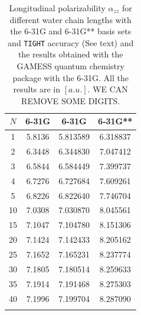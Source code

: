 \documentclass[prl,aps,twocolumn,showpacs,twocolumngrid,superbib]{revtex4}
\begin{document}
\begin{table}[t]
  \centering
  \caption{\protect
    Longitudinal polarizability $\alpha_{zz}$
    for different water chain lengths with the 6-31G and 6-31G** basis sets
    and {\tt TIGHT} accuracy (See text) and the results obtained with
    the GAMESS quantum chemistry package \cite{gamess} with the 6-31G. 
    All the results are in $[a.u.]$.
    WE CAN REMOVE SOME DIGITS.
  }\label{tab:Alpha_1D_Values}
  \begin{tabular}{cccc}
    \toprule
    $N$ &\multicolumn{1}{c}{6-31G\footnotemark[1]}
        &\multicolumn{1}{c}{6-31G\footnotemark[2]}
        &\multicolumn{1}{c}{6-31G**\footnotemark[2]}\\
    \hline
     1 & 5.8136 & 5.813589 & 6.318837     \\
     2 & 6.3448 & 6.344830 & 7.047412     \\
     3 & 6.5844 & 6.584449 & 7.399737     \\
     4 & 6.7276 & 6.727684 & 7.609261     \\
     5 & 6.8226 & 6.822640 & 7.746704     \\
    10 & 7.0308 & 7.030870 & 8.045561     \\
    15 & 7.1047 & 7.104780 & 8.151306     \\
    20 & 7.1424 & 7.142433 & 8.205162     \\
    25 & 7.1652 & 7.165231 & 8.237774     \\
    30 & 7.1805 & 7.180514 & 8.259633     \\
    35 & 7.1914 & 7.191468 & 8.275303     \\
    40 & 7.1996 & 7.199704 & 8.287090     \\
    \botrule
  \end{tabular}
\end{table}
\end{document}
